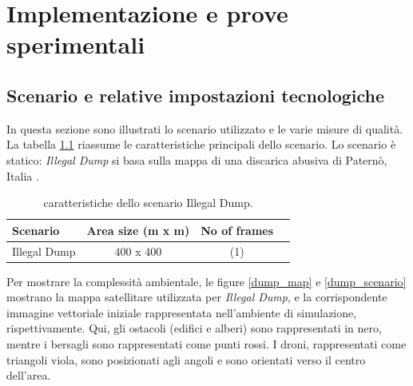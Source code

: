\chapter{Implementazione e prove sperimentali}

\section{Scenario e relative impostazioni tecnologiche}

In questa sezione sono illustrati lo scenario utilizzato e le varie misure di qualità. 
La tabella \ref{tabella_scenario} riassume le caratteristiche principali dello scenario. 
Lo scenario è statico: \textit{Illegal Dump} si basa sulla mappa di una discarica abusiva di Paternò, Italia \cite{trashout2018}.

\begin{table}[H]
    \centering
    
    \begin{tabular}{|l|c|c|c|}
    \hline
    \textbf{Scenario}              & \textbf{Area size (m x m)}                        & \textbf{No of frames}      \\ \hline
    Illegal Dump                   & 400 x 400                                         & (1)                           \\ \hline
    \end{tabular}%
    
    \caption{caratteristiche dello scenario Illegal Dump.}
    \label{tabella_scenario}
\end{table}

Per mostrare la complessità ambientale, le figure \ref{dump_map} e \ref{dump_scenario} mostrano la mappa satellitare utilizzata per \textit{Illegal Dump}, e la corrispondente immagine vettoriale iniziale rappresentata nell'ambiente di simulazione, rispettivamente. 
Qui, gli ostacoli (edifici e alberi) sono rappresentati in nero, mentre i bersagli sono rappresentati come punti rossi. 
I droni, rappresentati come triangoli viola, sono posizionati agli angoli e sono orientati verso il centro dell'area.

